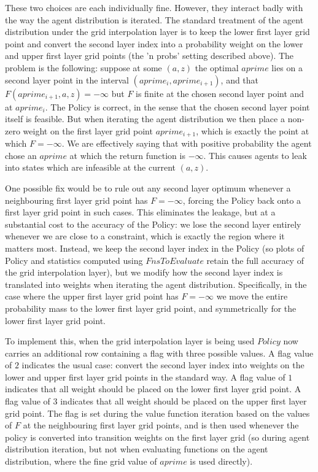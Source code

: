\documentclass[11pt,fleqn]{article}
\begin{document}
These two choices are each individually fine. However, they interact badly with the way the agent distribution is iterated. The standard treatment of the agent distribution under the grid interpolation layer is to keep the lower first layer grid point and convert the second layer index into a probability weight on the lower and upper first layer grid points (the 'n probs' setting described above). The problem is the following: suppose at some $(a,z)$ the optimal $aprime$ lies on a second layer point in the interval $(aprime_i,aprime_{i+1})$, and that $F(aprime_{i+1},a,z)=-\infty$ but $F$ is finite at the chosen second layer point and at $aprime_i$. The Policy is correct, in the sense that the chosen second layer point itself is feasible. But when iterating the agent distribution we then place a non-zero weight on the first layer grid point $aprime_{i+1}$, which is exactly the point at which $F=-\infty$. We are effectively saying that with positive probability the agent chose an $aprime$ at which the return function is $-\infty$. This causes agents to leak into states which are infeasible at the current $(a,z)$.

One possible fix would be to rule out any second layer optimum whenever a neighbouring first layer grid point has $F=-\infty$, forcing the Policy back onto a first layer grid point in such cases. This eliminates the leakage, but at a substantial cost to the accuracy of the Policy: we lose the second layer entirely whenever we are close to a constraint, which is exactly the region where it matters most. Instead, we keep the second layer index in the Policy (so plots of Policy and statistics computed using $FnsToEvaluate$ retain the full accuracy of the grid interpolation layer), but we modify how the second layer index is translated into weights when iterating the agent distribution. Specifically, in the case where the upper first layer grid point has $F=-\infty$ we move the entire probability mass to the lower first layer grid point, and symmetrically for the lower first layer grid point.

To implement this, when the grid interpolation layer is being used $Policy$ now carries an additional row containing a flag with three possible values. A flag value of $2$ indicates the usual case: convert the second layer index into weights on the lower and upper first layer grid points in the standard way. A flag value of $1$ indicates that all weight should be placed on the lower first layer grid point. A flag value of $3$ indicates that all weight should be placed on the upper first layer grid point. The flag is set during the value function iteration based on the values of $F$ at the neighbouring first layer grid points, and is then used whenever the policy is converted into transition weights on the first layer grid (so during agent distribution iteration, but not when evaluating functions on the agent distribution, where the fine grid value of $aprime$ is used directly).
\end{document}
